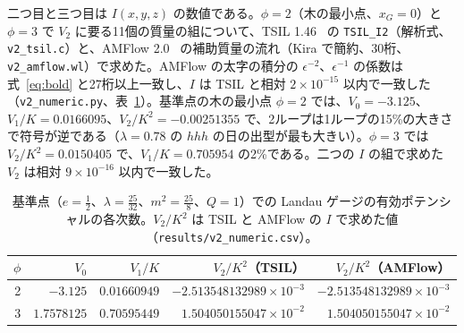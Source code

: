 \documentclass[a4paper,10pt]{ltjsarticle}
\begin{document}
二つ目と三つ目は $I(x,y,z)$ の数値である。$\phi=2$（木の最小点、$x_G=0$）と $\phi=3$ で $V_2$ に要る11個の質量の組について、TSIL 1.46~\cite{tsil} の \texttt{TSIL\_I2}（解析式、\texttt{v2\_tsil.c}）と、AMFlow 2.0~\cite{amflow} の補助質量の流れ（Kira で簡約、30桁、\texttt{v2\_amflow.wl}）で求めた。AMFlow の太字の積分の $\epsilon^{-2}$、$\epsilon^{-1}$ の係数は式~\eqref{eq:bold} と27桁以上一致し、$I$ は TSIL と相対 $2\times10^{-15}$ 以内で一致した（\texttt{v2\_numeric.py}、表~\ref{tab:v2num}）。基準点の木の最小点 $\phi=2$ では、$V_0=-3.125$、$V_1/K=0.0166095$、$V_2/K^2=-0.00251355$ で、2ループは1ループの15\%の大きさで符号が逆である（$\lambda=0.78$ の $hhh$ の日の出型が最も大きい）。$\phi=3$ では $V_2/K^2=0.0150405$ で、$V_1/K=0.705954$ の2\%である。二つの $I$ の組で求めた $V_2$ は相対 $9\times10^{-16}$ 以内で一致した。

\begin{table}[tbp]
\centering\small
\caption{基準点（$e=\frac12$、$\lambda=\frac{25}{32}$、$m^2=\frac{25}8$、$Q=1$）での Landau ゲージの有効ポテンシャルの各次数。$V_2/K^2$ は TSIL と AMFlow の $I$ で求めた値（\texttt{results/v2\_numeric.csv}）。}
\label{tab:v2num}
\begin{tabular}{rrrrr}
\toprule
$\phi$ & $V_0$ & $V_1/K$ & $V_2/K^2$（TSIL） & $V_2/K^2$（AMFlow） \\
\midrule
2 & $-3.125$ & $0.01660949$ & $-2.513548132989\times10^{-3}$ & $-2.513548132989\times10^{-3}$ \\
3 & $1.7578125$ & $0.70595449$ & $1.504050155047\times10^{-2}$ & $1.504050155047\times10^{-2}$ \\
\bottomrule
\end{tabular}
\end{table}
\end{document}
